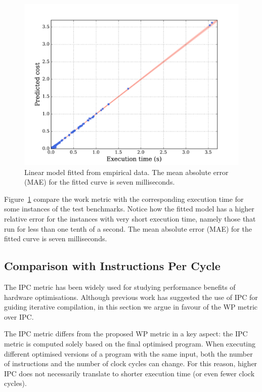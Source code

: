 \documentclass[sigplan,10pt]{acmart}
\theoremstyle{definition}
\newcommand{\itercomp}{{iterative compilation}}
\begin{document}
\begin{figure}[htb]
    \centering
    \includegraphics[width=0.9\linewidth]{figs/cost-model.pdf}
    \caption{Linear model fitted from empirical data. The mean absolute error (MAE) for the fitted curve is seven milliseconds.}
    \label{fig:cost-model}
\end{figure}

Figure~\ref{fig:cost-model} compare the work metric with the corresponding execution time for some instances of the test benchmarks.
Notice how the fitted model has a higher relative error for the instances with very short execution time, namely those that run for less than one tenth of a second.
The mean absolute error (MAE) for the fitted curve is seven milliseconds.

\subsection{Comparison with Instructions Per Cycle} \label{sec:ipc-vs-work-metric}

The IPC metric has been widely used for studying performance benefits of hardware optimisations.
Although previous work has suggested the use of IPC for guiding {\itercomp}, in this section we argue in favour of the WP metric over IPC.

The IPC metric differs from the proposed WP metric in a key aspect:
the IPC metric is computed solely based on the final optimised program.
When executing different optimised versions of a program with the same input, both the number of instructions and the number of clock cycles can change.
For this reason, higher IPC does not necessarily translate to shorter execution time (or even fewer clock cycles).
\end{document}

